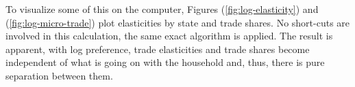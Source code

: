 \documentclass[12pt,pdftex]{article}
\begin{document}
\begin{onehalfspacing}
To visualize some of this on the computer, Figures (\ref{fig:log-elasticity}) and (\ref{fig:log-micro-trade}) plot elasticities by state and trade shares. No short-cuts are involved in this calculation, the same exact algorithm is applied. The result is apparent, with log preference, trade elasticities and trade shares become independent of what is going on with the household and, thus, there is pure separation between them.

\end{onehalfspacing}
\end{document}
